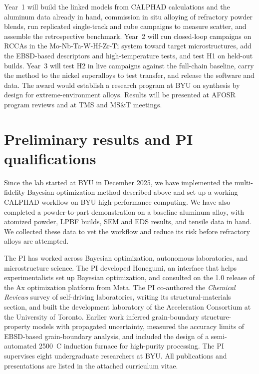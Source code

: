 \documentclass[12pt,letterpaper]{article}
\newcommand{\degC}{\textdegree{}C}
\begin{document}
Year~1 will build the linked models from CALPHAD calculations and the aluminum
data already in hand, commission in situ alloying of refractory powder blends,
run replicated single-track and cube campaigns to measure scatter, and
assemble the retrospective benchmark. Year~2 will run closed-loop campaigns on
RCCAs in the Mo-Nb-Ta-W-Hf-Zr-Ti system toward target microstructures, add the
EBSD-based descriptors and high-temperature tests, and test H1 on held-out
builds. Year~3 will test H2 in live campaigns against the full-chain baseline,
carry the method to the nickel superalloys to test transfer, and release the
software and data. The award would establish a research program at BYU on
synthesis by design for extreme-environment alloys. Results will be
presented at AFOSR program reviews and at TMS and MS\&T meetings.

\section{Preliminary results and PI qualifications}

Since the lab started at BYU in December 2025, we have implemented the
multi-fidelity Bayesian optimization method described above and set up a
working CALPHAD workflow on BYU high-performance computing. We have also
completed a powder-to-part demonstration on a baseline aluminum alloy, with
atomized powder, LPBF builds, SEM and EDS results, and tensile data in hand.
We collected these data to vet the workflow and reduce its risk before
refractory alloys are attempted.

The PI has worked across Bayesian optimization, autonomous laboratories, and
microstructure science. The PI developed Honegumi, an interface that helps
experimentalists set up Bayesian optimization, and consulted on the 1.0 release
of the Ax optimization platform from Meta. The PI co-authored the
\emph{Chemical Reviews} survey of self-driving laboratories, writing its
structural-materials section, and built the development laboratory of the
Acceleration Consortium at the University of Toronto. Earlier work inferred grain-boundary structure-property
models with propagated uncertainty, measured the accuracy limits of EBSD-based
grain-boundary analysis, and included the design of a semi-automated
2500~\degC{} induction furnace for high-purity processing. The PI supervises
eight undergraduate researchers at BYU. All publications and presentations are
listed in the attached curriculum vitae.
\end{document}
